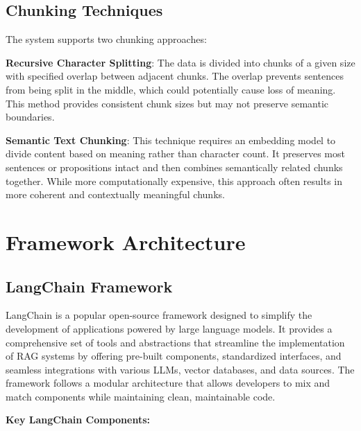 \documentclass[11pt,a4paper]{report}
\begin{document}
\subsection{Chunking Techniques}
The system supports two chunking approaches:

\textbf{Recursive Character Splitting}: The data is divided into chunks of a given size with specified overlap between adjacent chunks. The overlap prevents sentences from being split in the middle, which could potentially cause loss of meaning. This method provides consistent chunk sizes but may not preserve semantic boundaries.

\textbf{Semantic Text Chunking}: This technique requires an embedding model to divide content based on meaning rather than character count. It preserves most sentences or propositions intact and then combines semantically related chunks together. While more computationally expensive, this approach often results in more coherent and contextually meaningful chunks.

\section{Framework Architecture}

\subsection{LangChain Framework}
LangChain is a popular open-source framework designed to simplify the development of applications powered by large language models. It provides a comprehensive set of tools and abstractions that streamline the implementation of RAG systems by offering pre-built components, standardized interfaces, and seamless integrations with various LLMs, vector databases, and data sources. The framework follows a modular architecture that allows developers to mix and match components while maintaining clean, maintainable code.

\textbf{Key LangChain Components:}
\end{document}
